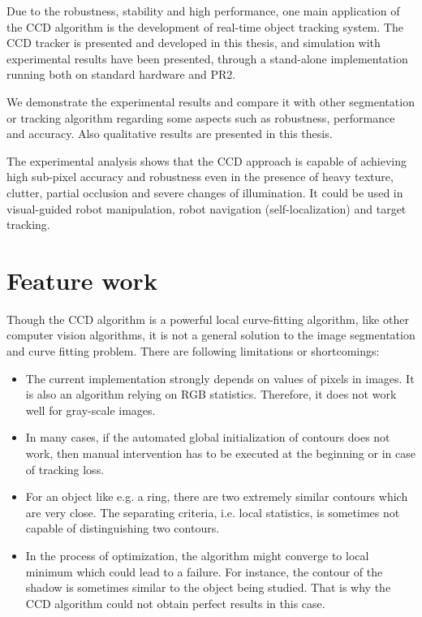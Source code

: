 Due to the robustness, stability and high performance, one main
application of the CCD algorithm is the development of real-time
object tracking system. The CCD tracker is presented and developed in
this thesis, and simulation with experimental results have been presented, through a
stand-alone implementation running both on
standard hardware and PR2.

We demonstrate the experimental results and compare it with other
segmentation or tracking algorithm regarding some aspects such as
robustness, performance and accuracy. Also qualitative
results are presented in this thesis.

The experimental analysis shows that the CCD approach is capable of
achieving high sub-pixel accuracy and robustness even in the presence
of heavy texture, clutter, partial occlusion and severe changes of
illumination. It could be used in  visual-guided robot
manipulation, robot navigation (self-localization) and target
tracking.

\section{Feature work}
\label{sec:feature}

Though the CCD algorithm is a powerful local curve-fitting algorithm,
like other computer vision algorithms, it is not a general solution to
the image segmentation and curve fitting problem. There are following
limitations or shortcomings:
\begin{itemize}
\item The current implementation strongly depends on values of pixels in
  images. It is also an algorithm relying on RGB statistics. Therefore, it
  does not work well for gray-scale images.
\item In many cases, if the automated global initialization of contours does
  not work, then manual intervention has to be executed at the beginning or
  in case of tracking loss.
\item For an object like e.g. a ring, there are two extremely similar
  contours which are very close. The separating criteria, i.e. local
  statistics, is sometimes not capable of distinguishing two contours.
\item In the process of optimization, the algorithm might converge to
  local minimum which could lead to a failure. For instance, the
  contour of the shadow is sometimes similar to the object being
  studied. That is why the CCD algorithm could not obtain perfect results in this case.
\end{itemize}

